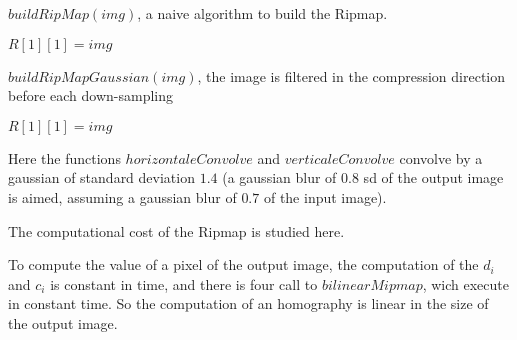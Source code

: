 \medbreak
\medbreak
\begin{algorithm}[H]
\caption{$buildRipMap(img)$, a naive algorithm to build the Ripmap.}
\label{buildRipmap1}
$R[1][1] = img$\;

\end{algorithm}
\medbreak
\medbreak
\medbreak
\medbreak
\begin{algorithm}[H]
\caption{$buildRipMapGaussian(img)$, the image is filtered in the compression direction before each down-sampling}
\label{buildRipmap2}
$R[1][1] = img$\;

\end{algorithm}
\medbreak
\medbreak

Here the functions $horizontaleConvolve$ and $verticaleConvolve$ convolve by a gaussian of standard deviation $1.4$ \cite{morel2011sift} (a gaussian blur of $0.8$ sd of the output image is aimed, assuming a gaussian blur of $0.7$ of the input image).



The computational cost of the Ripmap is studied here.

To compute the value of a pixel of the output image, the computation of the $d_i$ and $c_i$ is constant in time, and there is four call to $bilinearMipmap$, wich execute in constant time. So the computation of an homography is linear in the size of the output image.


